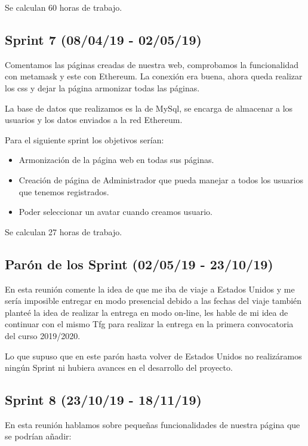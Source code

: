 Se calculan 60 horas de trabajo.
	
\subsection{Sprint 7 (08/04/19 - 02/05/19)}

Comentamos las páginas creadas de nuestra web, comprobamos la funcionalidad con metamask y este con Ethereum. La conexión era buena, ahora queda realizar los css y dejar la página armonizar todas las páginas. 

La base de datos que realizamos es la de MySql, se encarga de almacenar a los usuarios y los datos enviados a la red Ethereum.

Para el siguiente sprint los objetivos serían:

\begin{itemize}
	\item Armonización de la página web en todas sus páginas.
	\item Creación de página de Administrador que pueda manejar a todos los usuarios que tenemos registrados.
	\item Poder seleccionar un avatar cuando creamos usuario.
\end{itemize}

Se calculan 27 horas de trabajo.


\subsection{Parón de los Sprint (02/05/19 - 23/10/19)}

En esta reunión comente la idea de que me iba de viaje a Estados Unidos y me sería imposible entregar en modo presencial debido a las fechas del viaje también planteé la idea de realizar la entrega en modo on-line, les hable de mi idea de continuar con el mismo Tfg para realizar la entrega en la primera convocatoria del curso 2019/2020.

Lo que supuso que en este parón hasta volver de Estados Unidos no realizáramos ningún Sprint ni hubiera avances en el desarrollo del proyecto.


\subsection{Sprint 8 (23/10/19 - 18/11/19)}

En esta reunión hablamos sobre pequeñas funcionalidades de nuestra página que se podrían añadir:

